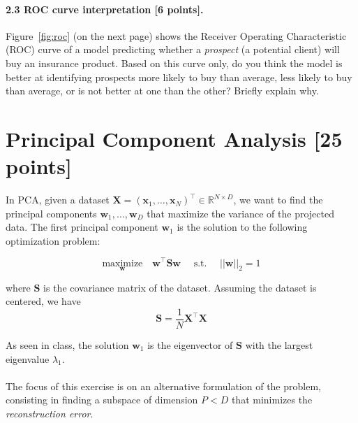 \documentclass{article}
\begin{document}
\paragraph{2.3 ROC curve interpretation [6 points].}
Figure~\ref{fig:roc} (on the next page) shows the Receiver Operating Characteristic (ROC) curve of a model predicting whether a \textit{prospect} (a potential client) will buy an insurance product. Based on this curve only, do you think the model is better at identifying prospects more likely to buy than average, less likely to buy than average, or is not better at one than the other? Briefly explain why.


\section{Principal Component Analysis [25 points]}

In PCA, given a dataset $\mathbf{X} = (\mathbf{x}_1, \ldots, \mathbf{x}_N)^\top \in \mathbb{R}^{N \times D}$, we want to find the principal components $\mathbf{w}_1, \ldots, \mathbf{w}_D$ that maximize the variance of the projected data. The first principal component $\mathbf{w}_1$ is the solution to the following optimization problem:

\begin{equation}
\label{eq:pca_variance}
\underset{\mathbf{w}}{\text{maximize}} \quad \mathbf{w}^\top \mathbf{S} \mathbf{w}
\quad \text{ s.t. } \quad ||\mathbf{w}||_2 = 1
\end{equation}

where $\mathbf{S}$ is the covariance matrix of the dataset. Assuming the dataset is centered, we have
\begin{equation}
\label{eq:pca_covariance_matrix}
\mathbf{S} = \frac{1}{N} \mathbf{X}^\top \mathbf{X}
\end{equation}

As seen in class, the solution $\mathbf{w}_1$ is the eigenvector of $\mathbf{S}$ with the largest eigenvalue $\lambda_1$.

\paragraph{}
The focus of this exercise is on an alternative formulation of the problem, consisting in finding a subspace of dimension $P < D$ that minimizes the \emph{reconstruction error}.
\end{document}
